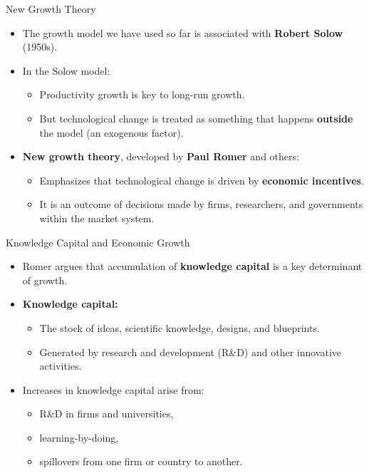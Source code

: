 \documentclass[aspectratio=169]{beamer}
\begin{document}
\begin{frame}{New Growth Theory}
\transfade
\begin{itemize}[<+->]
  \item The growth model we have used so far is associated with \textbf{Robert Solow} (1950s).
  \item In the Solow model:
  \begin{itemize}[<+->]
    \item Productivity growth is key to long-run growth.
    \item But technological change is treated as something that happens \textbf{outside} the model (an exogenous factor).
  \end{itemize}
  \item \textbf{New growth theory}, developed by \textbf{Paul Romer} and others:
  \begin{itemize}[<+->]
    \item Emphasizes that technological change is driven by \textbf{economic incentives}.
    \item It is an outcome of decisions made by firms, researchers, and governments within the market system.
  \end{itemize}
\end{itemize}
\end{frame}

\begin{frame}{Knowledge Capital and Economic Growth}
\transfade
\begin{itemize}[<+->]
  \item Romer argues that accumulation of \textbf{knowledge capital} is a key determinant of growth.
  \item \textbf{Knowledge capital:}
  \begin{itemize}[<+->]
    \item The stock of ideas, scientific knowledge, designs, and blueprints.
    \item Generated by research and development (R\&D) and other innovative activities.
  \end{itemize}
  \item Increases in knowledge capital arise from:
  \begin{itemize}[<+->]
    \item R\&D in firms and universities,
    \item learning-by-doing,
    \item spillovers from one firm or country to another.
  \end{itemize}
\end{itemize}
\end{frame}
\end{document}
